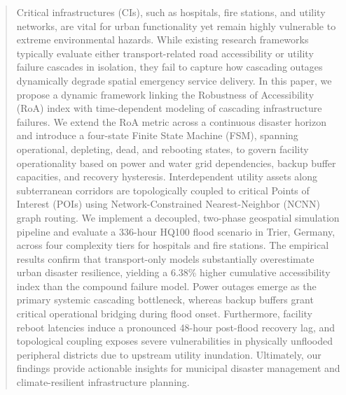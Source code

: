 

\begin{abstract}
    Critical infrastructures (CIs), such as hospitals, fire stations, and utility networks, are vital for urban functionality yet remain highly vulnerable to extreme environmental hazards.
    While existing research frameworks typically evaluate either transport-related road accessibility or utility failure cascades in isolation, they fail to capture how cascading outages dynamically degrade spatial emergency service delivery.
    In this paper, we propose a dynamic framework linking the Robustness of Accessibility (RoA) index with time-dependent modeling of cascading infrastructure failures.
    We extend the RoA metric across a continuous disaster horizon and introduce a four-state Finite State Machine (FSM), spanning operational, depleting, dead, and rebooting states, to govern facility operationality based on power and water grid dependencies, backup buffer capacities, and recovery hysteresis.
    Interdependent utility assets along subterranean corridors are topologically coupled to critical Points of Interest (POIs) using Network-Constrained Nearest-Neighbor (NCNN) graph routing.
    We implement a decoupled, two-phase geospatial simulation pipeline and evaluate a 336-hour HQ100 flood scenario in Trier, Germany, across four complexity tiers for hospitals and fire stations.
    The empirical results confirm that transport-only models substantially overestimate urban disaster resilience, yielding a 6.38\% higher cumulative accessibility index than the compound failure model.
    Power outages emerge as the primary systemic cascading bottleneck, whereas backup buffers grant critical operational bridging during flood onset.
    Furthermore, facility reboot latencies induce a pronounced 48-hour post-flood recovery lag, and topological coupling exposes severe vulnerabilities in physically unflooded peripheral districts due to upstream utility inundation.
    Ultimately, our findings provide actionable insights for municipal disaster management and climate-resilient infrastructure planning.


\end{abstract}

\newpage